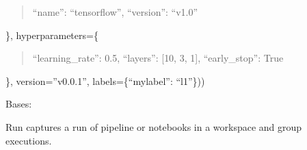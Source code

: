 \documentclass[letterpaper,10pt,english]{sphinxmanual}
\begin{document}
\begin{fulllineitems}
\begin{fulllineitems}
\begin{description}
\begin{quote}
“name”: “tensorflow”,
“version”: “v1.0”
\end{quote}

\},
hyperparameters=\{
\begin{quote}

“learning\_rate”: 0.5,
“layers”: {[}10, 3, 1{]},
“early\_stop”: True
\end{quote}

\},
version=”v0.0.1”,
labels=\{“mylabel”: “l1”\}))

\end{description}

\end{fulllineitems}


\begin{fulllineitems}
\label{\detokenize{source/md:kubeflow.metadata.metadata.Model.ARTIFACT_TYPE_NAME}}
\end{fulllineitems}


\begin{fulllineitems}
\label{\detokenize{source/md:kubeflow.metadata.metadata.Model.serialization}}
\end{fulllineitems}


\end{fulllineitems}


\begin{fulllineitems}
\label{\detokenize{source/md:kubeflow.metadata.metadata.Run}}
Bases: 

Run captures a run of pipeline or notebooks in a workspace and group
executions.

\end{fulllineitems}
\end{document}
